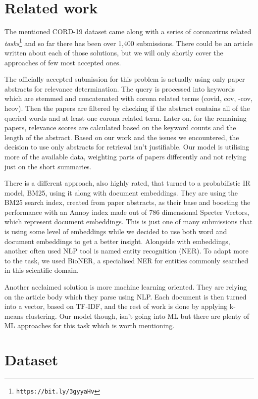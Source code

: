 \documentclass[10pt, a4paper]{article}
\begin{document}
\section{Related work}

The mentioned CORD-19 dataset came along with a series of coronavirus related \emph{tasks}\footnote{\texttt{https://bit.ly/3gyyaHv}} and so far there has been over 1,400 submissions. There could be an article written about each of those solutions, but we will only shortly cover the approaches of few most accepted ones.

The officially accepted submission for this problem is actually using only paper abstracts for relevance determination. The query is processed into keywords which are stemmed and concatenated with corona related terms (covid, cov, -cov, hcov). Then the papers are filtered by checking if the abstract contains all of the queried words and at least one corona related term. Later on, for the remaining papers, relevance scores are calculated based on the keyword counts and the length of the abstract. Based on our work and the issues we encountered, the decision to use only abstracts for retrieval isn't justifiable. Our model is utilising more of the available data, weighting parts of papers differently and not relying just on the short summaries.

There is a different approach, also highly rated, that turned to a probabilistic IR model, BM25, using it along with document embeddings. They are using the BM25 search index, created from paper abstracts, as their base and boosting the performance with an Annoy index made out of 786 dimensional Specter Vectors, which represent document embeddings. This is just one of many submissions that is using some level of embeddings while we decided to use both word and document embeddings to get a better insight. Alongside with embeddings, another often used NLP tool is named entity recognition (NER). To adapt more to the task, we used BioNER, a specialised NER for entities commonly searched in this scientific domain.

Another acclaimed solution is more machine learning oriented. They are relying on the article body which they parse using NLP. Each document is then turned into a vector, based on TF-IDF, and the rest of work is done by applying k-means clustering. Our model though, isn't going into ML but there are plenty of ML approaches for this task which is worth mentioning.

\section{Dataset}
\end{document}
